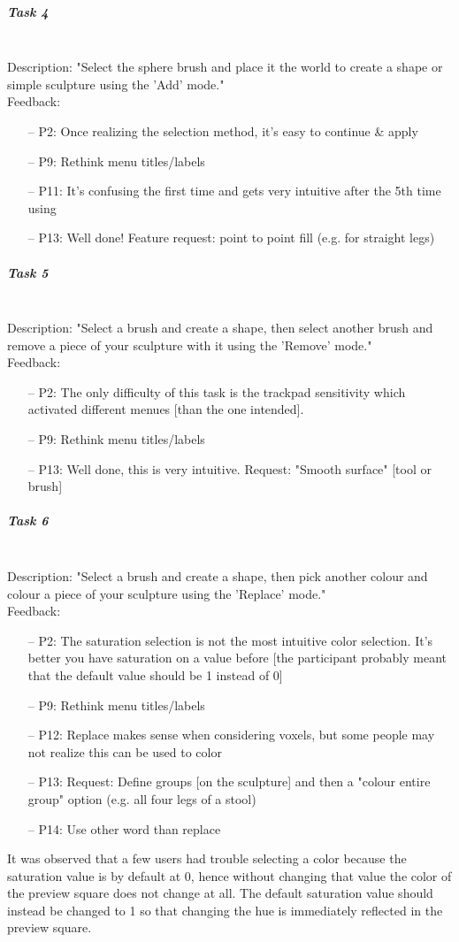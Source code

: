 \subparagraph{Task 4} \hfill \\
Description: "Select the sphere brush and place it the world to create a shape or simple sculpture using the 'Add' mode."\\
Feedback:
\begin{itemize} \setlength\itemsep{-0.5em}
	\item[--] P2: Once realizing the selection method, it's easy to continue \& apply
	\item[--] P9: Rethink menu titles/labels
	\item[--] P11: It's confusing the first time and gets very intuitive after the 5th time using
	\item[--] P13: Well done! Feature request: point to point fill (e.g. for straight legs)
\end{itemize}

\subparagraph{Task 5} \hfill \\
Description: "Select a brush and create a shape, then select another brush and remove a piece of your sculpture with it using the 'Remove' mode."\\
Feedback:
\begin{enumerate} \setlength\itemsep{-0.5em}
	\item[--] P2: The only difficulty of this task is the trackpad sensitivity which activated different menues [than the one intended].
	\item[--] P9: Rethink menu titles/labels
	\item[--] P13: Well done, this is very intuitive. Request: "Smooth surface" [tool or brush]
\end{enumerate}

\subparagraph{Task 6} \hfill \\
Description: "Select a brush and create a shape, then pick another colour and colour a piece of your sculpture using the 'Replace' mode."\\
Feedback:
\begin{enumerate} \setlength\itemsep{-0.5em}
	\item[--] P2: The saturation selection is not the most intuitive color selection. It's better you have saturation on a value before [the participant probably meant that the default value should be 1 instead of 0]
	\item[--] P9: Rethink menu titles/labels
	\item[--] P12: Replace makes sense when considering voxels, but some people may not realize this can be used to color
	\item[--] P13: Request: Define groups [on the sculpture] and then a "colour entire group" option (e.g. all four legs of a stool)
	\item[--] P14: Use other word than replace
\end{enumerate}
It was observed that a few users had trouble selecting a color because the saturation value is by default at 0, hence without changing that value the color of the preview square does not change at all.
The default saturation value should instead be changed to 1 so that changing the hue is immediately reflected in the preview square.

